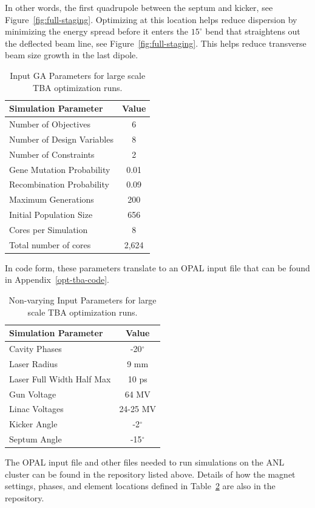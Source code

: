In other words, the first quadrupole between the septum and kicker, see Figure~\ref{fig:full-staging}.
Optimizing at this location helps reduce dispersion by minimizing 
the energy spread before it enters the $15^\circ$ bend that straightens out 
the deflected beam line, see Figure~\ref{fig:full-staging}.
This helps reduce transverse beam size growth in the last dipole.
\begin{table}%
	\begin{center}
		\caption{Input GA Parameters for large scale TBA optimization runs.}
		\label{tab:opt-tba}
		\begin{tabular}{lc}
			\toprule
			\toprule
			\textbf{Simulation Parameter} 	&  \textbf{Value} \\ 
			\midrule
			{Number of Objectives}			&  6 \\
			Number of Design Variables		&  8 \\
			Number of Constraints			&  2 \\
			{Gene Mutation Probability} 	&  0.01\\ 
			{Recombination Probability} 	&  0.09 \\
			{Maximum  Generations}			&  200 \\
			{Initial  Population Size}		&  656\\ 
			Cores per Simulation 			&  8 \\
			Total number of cores			& 2,624  \\
			\bottomrule
		\end{tabular}
	\end{center}
\end{table}
In code form, these parameters translate to an OPAL input file that 
can be found in Appendix~\ref{opt-tba-code}.
\begin{table}%
	\begin{center}
		\caption{Non-varying Input Parameters for large scale TBA optimization runs.}
		\label{tab:variables}
		\begin{tabular}{lc}
			\toprule
			\toprule
			\textbf{Simulation Parameter} 	&  \textbf{Value} \\ 
			\midrule
			Cavity Phases		&  -20$^\circ$ \\
			Laser Radius		& 9 mm \\
			Laser Full Width Half Max	& 10 ps \\
			Gun Voltage 				& 64 MV\\ 
			Linac Voltages 				& 24-25 MV \\
			Kicker Angle				& -2$^\circ$ \\
			Septum Angle				& -15$^\circ$\\ 
			\bottomrule
		\end{tabular}
	\end{center}
\end{table}
The OPAL input file and other files needed to run simulations on the ANL cluster 
can be found in the repository listed above.
Details of how the magnet settings, phases, and element locations defined 
in Table~\ref{tab:variables} are also in the repository.


